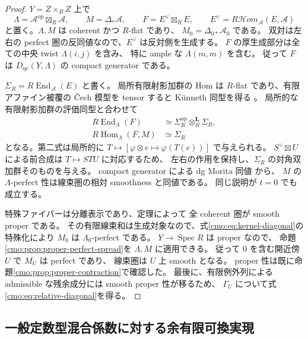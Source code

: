 \begin{proof}
$Y=Z\times_R Z$ 上で
\[
 \Lambda=\mathcal A^{\mathrm{op}}\boxtimes_R\mathcal A,
 \qquad M=\Delta_*\mathcal A,
 \qquad F=E^\vee\boxtimes_R E,
 \qquad E^\vee=R\mathcal Hom_{\mathcal A}(E,\mathcal A)
\]
と置く。$\Lambda,M$ は coherent かつ $R$-flat であり、
$M_0=\Delta_{0*}\mathcal A_0$ である。
双対は左右の perfect 圏の反同値なので、$E^\vee$ は反対側を生成する。
$F$ の厚生成部分は全ての中央 twist $\Lambda(i,j)$ を含み、
特に ample な $\Lambda(m,m)$ を含む。
従って $F$ は $D_{\mathrm{qc}}(Y,\Lambda)$ の compact generator である。

$\Sigma_R=R\operatorname{End}_{\mathcal A}(E)$ と書く。
局所有限射影加群の Hom は $R$-flat であり、有限アファイン被覆の
\v Cech 模型を tensor すると K\"unneth 同型を得る
\cite[Tag~0FU4]{CMOStacksDerived}。
局所的な有限射影加群の評価同型と合わせて
\begin{equation}\label{cmo:eq:kernel-diagonal}
 \begin{split}
 R\operatorname{End}_\Lambda(F)
      &\simeq\Sigma_R^{\mathrm{op}}\otimes_R^{\mathbf L}\Sigma_R,\\
 R\operatorname{Hom}_\Lambda(F,M)&\simeq\Sigma_R
 \end{split}
\end{equation}
となる。第二式は局所的に $T\mapsto[\varphi\otimes e\mapsto\varphi(T(e))]$ で与えられる。
$S^\vee\boxtimes U$ による前合成は $T\mapsto STU$ に対応するため、
左右の作用を保持し、$\Sigma_R$ の対角双加群そのものを与える。
compact generator による dg Morita 同値
\cite[Theorem~3.8(c)]{NFMKellerDg}から、
$M$ の $\Lambda$-perfect 性は線束圏の相対 smoothness と同値である。
同じ説明が $t=0$ でも成立する。

特殊ファイバーは分離表示であり、定理によって
全 coherent 圏が smooth proper である。
その有限線束和は生成対象なので、式\eqref{cmo:eq:kernel-diagonal}の特殊化により
$M_0$ は $\Lambda_0$-perfect である。
$Y\to\operatorname{Spec}R$ は proper なので、
命題\ref{cmo:prop:proper-perfect-spread}を $\Lambda,M$ に適用できる。
従って $0$ を含む開近傍 $U$ で $M_U$ は perfect であり、
線束圏は $U$ 上 smooth となる。
proper 性は既に命題\ref{cmo:prop:proper-contraction}で確認した。
最後に、有限例外列による admissible な残余成分には smooth proper 性が移るため、
$\Gamma_U$ について式\eqref{cmo:eq:relative-diagonal}を得る。
\end{proof}

\subsection{一般定数型混合係数に対する余有限可換実現}

